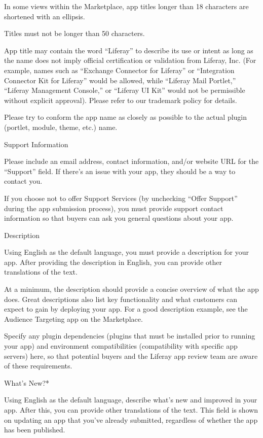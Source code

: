 In some views within the Marketplace, app titles longer than 18
characters are shortened with an ellipsis.

Titles must not be longer than 50 characters.

App title may contain the word ``Liferay'' to describe its use or intent
as long as the name does not imply official certification or validation
from Liferay, Inc. (For example, names such as ``Exchange Connector for
Liferay'' or ``Integration Connector Kit for Liferay'' would be allowed,
while ``Liferay Mail Portlet,'' ``Liferay Management Console,'' or
``Liferay UI Kit'' would not be permissible without explicit approval).
Please refer to our trademark policy for details.

Please try to conform the app name as closely as possible to the actual
plugin (portlet, module, theme, etc.) name.

Support Information

Please include an email address, contact information, and/or website URL
for the ``Support'' field. If there's an issue with your app, they
should be a way to contact you.

If you choose not to offer Support Services (by unchecking ``Offer
Support'' during the app submission process), you must provide support
contact information so that buyers can ask you general questions about
your app.

Description

Using English as the default language, you must provide a description
for your app. After providing the description in English, you can
provide other translations of the text.

At a minimum, the description should provide a concise overview of what
the app does. Great descriptions also list key functionality and what
customers can expect to gain by deploying your app. For a good
description example, see the Audience Targeting app on the Marketplace.

Specify any plugin dependencies (plugins that must be installed prior to
running your app) and environment compatibilities (compatibility with
specific app servers) here, so that potential buyers and the Liferay app
review team are aware of these requirements.

What's New?*

Using English as the default language, describe what's new and improved
in your app. After this, you can provide other translations of the text.
This field is shown on updating an app that you've already submitted,
regardless of whether the app has been published.

